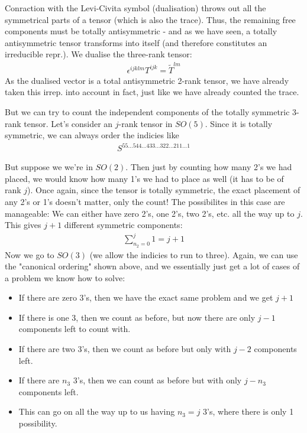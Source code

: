 \documentclass[a4paper]{article}
\theoremstyle{definition} %
\theoremstyle{plain} %
\theoremstyle{remark} %
\begin{document}
    Conraction with the Levi-Civita symbol (dualisation) throws out all the symmetrical parts of a tensor (which is also the trace). Thus, the remaining free components must be totally antisymmetric - and as we have seen, a totally antisymmetric tensor transforms into itself (and therefore constitutes an irreducible repr.). We dualise the three-rank tensor:
    \begin{align*}
        \epsilon^{ijklm} T^{ijk} = \tilde{T}^{lm}
    \end{align*}
    As the dualised vector is a total antisymmetric 2-rank tensor, we have already taken this irrep. into account in fact, just like we have already counted the trace.

    But we can try to count the independent components of the totally symmetric 3-rank tensor. Let's consider an \(j\)-rank tensor in \(SO(5)\). Since it is totally symmetric, we can always order the indicies like \begin{align*}
        S^{55\dots 544\dots 433\dots 322\dots 211\dots 1}
    \end{align*}

    But suppose we we're in \(SO(2)\). Then just by counting how many 2's we had placed, we would know how many 1's we had to place as well (it has to be of rank \(j\)). Once again, since the tensor is totally symmetric, the exact placement of any 2's or 1's doesn't matter, only the count! The possibilites in this case are manageable: We can either have zero 2's, one 2's, two 2's, etc. all the way up to \(j\). This gives \(j + 1\) different symmetric components: \begin{align*}
        \sum_{n_2 = 0}^j 1 = j + 1 
    \end{align*}
    Now we go to \(SO(3)\) (we allow the indicies to run to three). Again, we can use the "canonical ordering" shown above, and we essentially just get a lot of cases of a problem we know how to solve: \begin{itemize}
        \item If there are zero 3's, then we have the exact same problem and we get \(j + 1\)  
        \item If there is one 3, then we count as before, but now there are only \(j - 1\) components left to count with.
        \item If there are two 3's, then we count as before but only with \(j - 2\) components left.
        \item If there are \(n_3\) 3's, then we can count as before but with only \(j - n_3\) components left.
        \item This can go on all the way up to us having \(n_3 = j\) 3's, where there is only 1 possibility.  
    \end{itemize}
\end{document}
